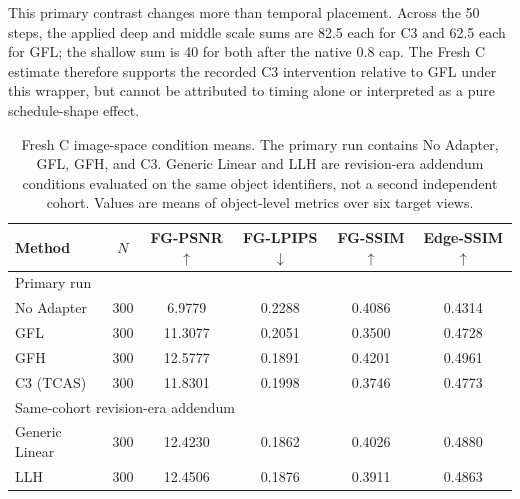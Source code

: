 \documentclass[times,twocolumn,final]{elsarticle}
\providecommand{\DIFadd}[1]{{\protect\color{blue} \sf #1}} %
\providecommand{\DIFaddbegin}{} %
\providecommand{\DIFaddend}{} %
\providecommand{\DIFaddFL}[1]{\DIFadd{#1}} %
\providecommand{\DIFaddbeginFL}{\DIFaddbegin} %
\providecommand{\DIFaddendFL}{\DIFaddend} %
\renewcommand{\DIFaddbeginFL}{}
\renewcommand{\DIFaddendFL}{}
\renewcommand{\DIFaddFL}[1]{#1}
\begin{document}
  \DIFaddbegin \DIFadd{This primary contrast changes more than temporal placement. Across the 50 steps, the applied deep and middle scale sums are 82.5 each for C3 and 62.5 each for GFL; the shallow sum is 40 for both after the native 0.8 cap. The Fresh C estimate therefore supports the recorded C3 intervention relative to GFL under this wrapper, but cannot be attributed to timing alone or interpreted as a pure schedule-shape effect.
}\DIFaddend 

  \DIFaddbeginFL \begin{table}[t]
\DIFaddendFL \centering
  \DIFaddbeginFL \caption{Fresh C image-space condition means. The primary run contains No Adapter, GFL, GFH, and C3. Generic Linear and LLH are revision-era addendum conditions evaluated on the same object identifiers, not a second independent cohort. Values are means of object-level metrics over six target views.}
\label{tab:freshc-absolute}
\scriptsize\setlength{\tabcolsep}{4pt}
\begin{tabular}{lccccc}
\DIFaddendFL \toprule
  \DIFaddbeginFL \DIFaddFL{Method }\DIFaddendFL &   \DIFaddbeginFL \DIFaddFL{$N$ }\DIFaddendFL &   \DIFaddbeginFL \DIFaddFL{FG-PSNR$\uparrow$ }\DIFaddendFL &   \DIFaddbeginFL \DIFaddFL{FG-LPIPS$\downarrow$ }\DIFaddendFL &   \DIFaddbeginFL \DIFaddFL{FG-SSIM$\uparrow$ }& \DIFaddFL{Edge-SSIM$\uparrow$ }\DIFaddendFL \\
\midrule
\DIFaddbeginFL \multicolumn{6}{l}{Primary run} \\
\DIFaddFL{No Adapter }& \DIFaddFL{300 }& \DIFaddFL{6.9779 }& \DIFaddFL{0.2288 }& \DIFaddFL{0.4086 }& \DIFaddFL{0.4314 }\\
\DIFaddFL{GFL }& \DIFaddFL{300 }& \DIFaddFL{11.3077 }& \DIFaddFL{0.2051 }& \DIFaddFL{0.3500 }& \DIFaddFL{0.4728 }\\
\DIFaddFL{GFH }& \DIFaddFL{300 }& \DIFaddFL{12.5777 }& \DIFaddFL{0.1891 }& \DIFaddFL{0.4201 }& \DIFaddFL{0.4961 }\\
\DIFaddendFL C3 \DIFaddbeginFL \DIFaddFL{(TCAS) }\DIFaddendFL &   \DIFaddbeginFL \DIFaddFL{300 }\DIFaddendFL &   \DIFaddbeginFL \DIFaddFL{11.8301 }\DIFaddendFL &   \DIFaddbeginFL \DIFaddFL{0.1998 }\DIFaddendFL &   \DIFaddbeginFL \DIFaddFL{0.3746 }& \DIFaddFL{0.4773 }\DIFaddendFL \\
  \DIFaddbeginFL \midrule
\multicolumn{6}{l}{Same-cohort revision-era addendum} \\
\DIFaddFL{Generic Linear }\DIFaddendFL &   \DIFaddbeginFL \DIFaddFL{300 }\DIFaddendFL &   \DIFaddbeginFL \DIFaddFL{12.4230 }\DIFaddendFL &   \DIFaddbeginFL \DIFaddFL{0.1862 }\DIFaddendFL &   \DIFaddbeginFL \DIFaddFL{0.4026 }& \DIFaddFL{0.4880 }\DIFaddendFL \\
  \DIFaddbeginFL \DIFaddFL{LLH }\DIFaddendFL &   \DIFaddbeginFL \DIFaddFL{300 }\DIFaddendFL &   \DIFaddbeginFL \DIFaddFL{12.4506 }\DIFaddendFL &   \DIFaddbeginFL \DIFaddFL{0.1876 }\DIFaddendFL &   \DIFaddbeginFL \DIFaddFL{0.3911 }& \DIFaddFL{0.4863 }\DIFaddendFL \\
  \DIFaddbeginFL \bottomrule
\end{tabular}
\end{table}
\end{document}
